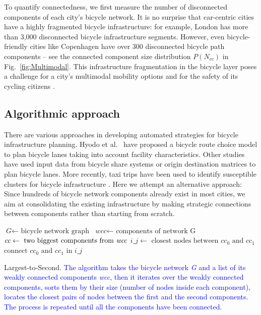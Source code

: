 To quantify connectedness, we first measure the number of disconnected components of each city's bicycle network. It is no surprise that car-centric cities have a highly fragmented bicycle infrastructure: for example, London has more than 3,000 disconnected bicycle infrastructure segments. However, even bicycle-friendly cities like Copenhagen have over 300 disconnected bicycle path components -- see the connected component size distribution $P( N_{cc} )$ in Fig.~\ref{fig:Multimodal}. This infrastructure fragmentation in the bicycle layer poses a challenge for a city's multimodal mobility options \cite{natera2020multimodal} and for the safety of its cycling citizens \cite{Dill2009infrastructure,Chataway2014Safety}.

\subsection{Algorithmic approach}

There are various approaches in developing automated strategies for bicycle infrastructure planning. Hyodo et al.~\cite{Hyodo2000Modeling} have proposed a bicycle route choice model to plan bicycle lanes taking into account facility characteristics. Other studies have used input data from bicycle share systems \cite{Bao2017Planning} or origin destination matrices \cite{Mauttone2017Design} to plan bicycle lanes. More recently, taxi trips have been used to identify susceptible clusters for bicycle infrastructure \cite{Akbarzadeh2018Design}. Here we attempt an alternative approach: Since hundreds of bicycle network components already exist in most cities, we aim at consolidating the existing infrastructure by making strategic connections between components rather than starting from scratch.


\begin{algorithm}[h!]
  \begin{algorithmic}[1]
    \State $\textit{G} \gets \text{ bicycle network graph}$
    \State $\textit{wcc} \gets \text{ components of network G}$
    \State  {}
    \State $\textit{cc} \gets \text{ two biggest components from \textit{wcc}}$
    \State $\textit{i\_j} \gets \text{ closest nodes between } cc_0 \text{ and } cc_1$
    \State $\text{connect } cc_0 \text{ and } cc_1 \text{ in } i\_j$
    \EndFor
    \EndProcedure
  \end{algorithmic}
  \caption{Largest-to-Second. \textcolor{blue}{The algorithm takes the bicycle network \textit{G} and a list of its weakly connected components \textit{wcc}, then it iterates over the weakly connected components, sorts them by their size (number of nodes inside each component), locates the closest pairs of nodes between the first and the second components. The process is repeated until all the components have been connected.}}\label{al:L2S}
\end{algorithm}

